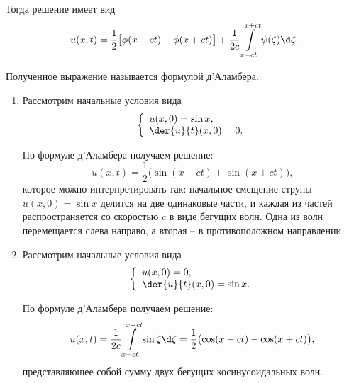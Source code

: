 Тогда решение имеет вид
\[
    u(x, t) = \frac{1}{2}\bigl[\phi(x - ct) + \phi(x + ct)\bigr] + \frac{1}{2c}
    \int\limits_{x - ct}^{x + ct} \psi(\zeta)\d\zeta.
\]

Полученное выражение называется формулой д'Аламбера.

\begin{enumerate}
    \item Рассмотрим начальные условия вида 
    \[
        \left\{ \begin{array}{l}
            u(x, 0) = \sin x, \\
            \ds \der{u}{t}(x, 0) = 0.
        \end{array} \right.
    \]
    
    По формуле д'Аламбера получаем решение:
    \[
        u(x, t) = \frac{1}{2}\bigl(\sin(x - ct) + \sin(x + ct)\bigr),
    \]
    которое можно интерпретировать так: начальное смещение струны
    \( u(x, 0) = \sin x \) делится на две одинаковые части, и каждая из частей
    распространяется со скоростью \( c \) в виде бегущих волн.
    Одна из волн перемещается слева направо, а вторая -- в противоположном
    направлении.
    
    \item Рассмотрим начальные условия вида 
    \[
        \left\{ \begin{array}{l}
            u(x, 0) = 0, \\
            \ds \der{u}{t}(x, 0) = \sin x.
        \end{array} \right.
    \]
    
    По формуле д'Аламбера получаем решение:
    \[
        u(x, t) = \frac{1}{2c}\int\limits_{x - ct}^{x + ct} \sin\zeta\d\zeta =
        \frac{1}{2}\bigl(\cos(x - ct) - \cos(x + ct)\bigr),
    \]
    представляющее собой сумму двух бегущих косинусоидальных волн.
\end{enumerate}

\newpage
